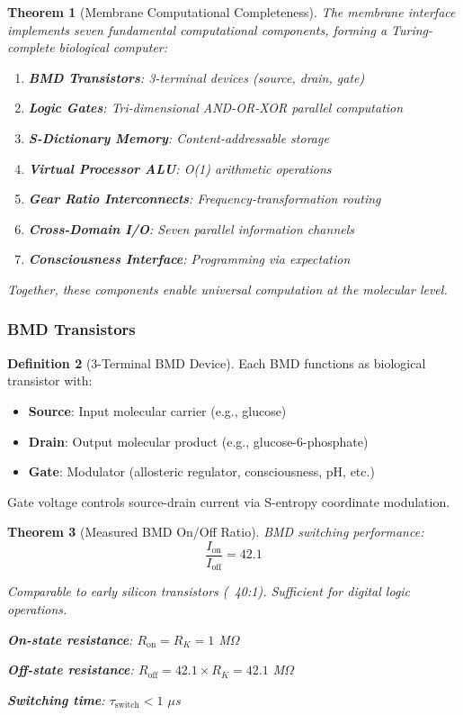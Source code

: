 \documentclass[11pt,a4paper]{article}
\newtheorem{theorem}{Theorem}[section]
\theoremstyle{definition}
\newtheorem{definition}[theorem]{Definition}
\theoremstyle{remark}
\begin{document}
\begin{theorem}[Membrane Computational Completeness]
\label{thm:computational_completeness}
The membrane interface implements seven fundamental computational components, forming a Turing-complete biological computer:

\begin{enumerate}
\item \textbf{BMD Transistors}: 3-terminal devices (source, drain, gate)
\item \textbf{Logic Gates}: Tri-dimensional AND-OR-XOR parallel computation
\item \textbf{S-Dictionary Memory}: Content-addressable storage
\item \textbf{Virtual Processor ALU}: O(1) arithmetic operations
\item \textbf{Gear Ratio Interconnects}: Frequency-transformation routing
\item \textbf{Cross-Domain I/O}: Seven parallel information channels
\item \textbf{Consciousness Interface}: Programming via expectation
\end{enumerate}

Together, these components enable universal computation at the molecular level.
\end{theorem}

\subsubsection{BMD Transistors}

\begin{definition}[3-Terminal BMD Device]
Each BMD functions as biological transistor with:
\begin{itemize}
\item \textbf{Source}: Input molecular carrier (e.g., glucose)
\item \textbf{Drain}: Output molecular product (e.g., glucose-6-phosphate)
\item \textbf{Gate}: Modulator (allosteric regulator, consciousness, pH, etc.)
\end{itemize}

Gate voltage controls source-drain current via S-entropy coordinate modulation.
\end{definition}

\begin{theorem}[Measured BMD On/Off Ratio]
BMD switching performance:
\begin{equation}
\frac{I_{\text{on}}}{I_{\text{off}}} = 42.1
\end{equation}

Comparable to early silicon transistors (~40:1). Sufficient for digital logic operations.

\textbf{On-state resistance}: $R_{\text{on}} = R_K = 1$ M$\Omega$

\textbf{Off-state resistance}: $R_{\text{off}} = 42.1 \times R_K = 42.1$ M$\Omega$

\textbf{Switching time}: $\tau_{\text{switch}} < 1$ $\mu$s
\end{theorem}
\end{document}
